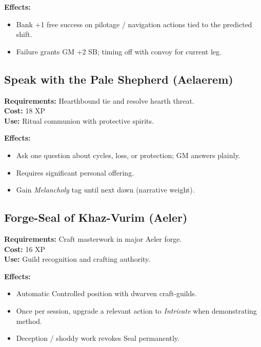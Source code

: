 \textbf{Effects:}
\begin{itemize}
    \item Bank +1 free success on pilotage / navigation actions tied to the predicted shift.
    \item Failure grants GM +2 SB; timing off with convoy for current leg.
\end{itemize}

\subsection{Speak with the Pale Shepherd (Aelaerem)}\label{subsec:pale_shepherd}

\textbf{Requirements:} Hearthbound tie and resolve hearth threat.\\
\textbf{Cost:} 18 XP\\
\textbf{Use:} Ritual communion with protective spirits.

\textbf{Effects:}
\begin{itemize}
    \item Ask one question about cycles, loss, or protection; GM answers plainly.
    \item Requires significant personal offering.
    \item Gain \emph{Melancholy} tag until next dawn (narrative weight).
\end{itemize}

\subsection{Forge-Seal of Khaz-Vurim (Aeler)}\label{subsec:forge_seal}

\textbf{Requirements:} Craft masterwork in major Aeler forge.\\
\textbf{Cost:} 16 XP\\
\textbf{Use:} Guild recognition and crafting authority.

\textbf{Effects:}
\begin{itemize}
    \item Automatic Controlled position with dwarven craft-guilds.
    \item Once per session, upgrade a relevant action to \emph{Intricate} when demonstrating method.
    \item Deception / shoddy work revokes Seal permanently.
\end{itemize}

